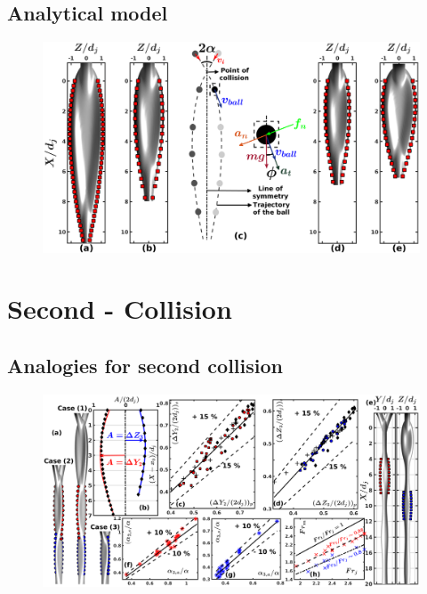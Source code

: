 \documentclass[%
aip,
sd,%
amsmath,amssymb,
preprint,%
author-year,%
]{revtex4-1}
\begin{document}
\subsection{Analytical model}
\begin{figure}
	\centering
	\includegraphics[width=\linewidth]{analytical}
	\caption{}
	\label{Figure::analytical}
\end{figure}
\cleardoublepage
\section{Second - Collision}
\lipsum[1]
\subsection{Analogies for second collision}
\lipsum
\begin{figure}
	\centering
	\includegraphics[width=\linewidth]{secondCollision}
	\caption{}
	\label{Figure::secondCollision}
\end{figure}
\lipsum
\end{document}

